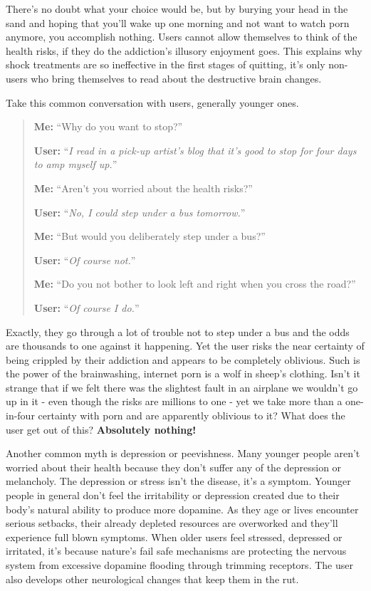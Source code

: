 \documentclass[
]{book}
\begin{document}
There's no doubt what your choice would be, but by burying your head in the sand and hoping that you'll wake up one morning and not want to watch porn anymore, you accomplish nothing. Users cannot allow themselves to think of the health risks, if they do the addiction's illusory enjoyment goes. This explains why shock treatments are so ineffective in the first stages of quitting, it's only non-users who bring themselves to read about the destructive brain changes.

Take this common conversation with users, generally younger ones.

\begin{quote}
\textbf{Me:} ``Why do you want to stop?''

\textbf{User:} ``\emph{I read in a pick-up artist's blog that it's good to stop for four days to amp myself up.}''

\textbf{Me:} ``Aren't you worried about the health risks?''

\textbf{User:} ``\emph{No, I could step under a bus tomorrow.}''

\textbf{Me:} ``But would you deliberately step under a bus?''

\textbf{User:} ``\emph{Of course not.}''

\textbf{Me:} ``Do you not bother to look left and right when you cross the road?''

\textbf{User:} ``\emph{Of course I do.}''
\end{quote}

Exactly, they go through a lot of trouble not to step under a bus and the odds are thousands to one against it happening. Yet the user risks the near certainty of being crippled by their addiction and appears to be completely oblivious. Such is the power of the brainwashing, internet porn is a wolf in sheep's clothing. Isn't it strange that if we felt there was the slightest fault in an airplane we wouldn't go up in it - even though the risks are millions to one - yet we take more than a one-in-four certainty with porn and are apparently oblivious to it? What does the user get out of this? \textbf{Absolutely nothing!}

Another common myth is depression or peevishness. Many younger people aren't worried about their health because they don't suffer any of the depression or melancholy. The depression or stress isn't the disease, it's a symptom. Younger people in general don't feel the irritability or depression created due to their body's natural ability to produce more dopamine. As they age or lives encounter serious setbacks, their already depleted resources are overworked and they'll experience full blown symptoms. When older users feel stressed, depressed or irritated, it's because nature's fail safe mechanisms are protecting the nervous system from excessive dopamine flooding through trimming receptors. The user also develops other neurological changes that keep them in the rut.
\end{document}

